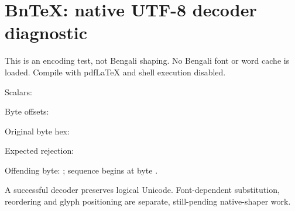 \documentclass[11pt]{article}
\begin{document}
\section*{BnTeX: native UTF-8 decoder diagnostic}
This is an encoding test, not Bengali shaping. No Bengali font or word cache is
loaded. Compile with pdfLaTeX and shell execution disabled.

  {%
   \par\noindent Scalars: \texttt{\BnTeXUTFviiiScalars}\par
   \noindent Byte offsets: \texttt{\BnTeXUTFviiiOffsets}\par
   \noindent Original byte hex: \texttt{\BnTeXUTFviiiHex}\par}
  {}

\medskip
{}
  {}
  {\noindent Expected rejection: \texttt{\BnTeXUTFviiiError}\par
   \noindent Offending byte: \BnTeXUTFviiiErrorOffset;
   sequence begins at byte \BnTeXUTFviiiErrorStart.\par}

\medskip
A successful decoder preserves logical Unicode. Font-dependent substitution,
reordering and glyph positioning are separate, still-pending native-shaper work.
\end{document}
